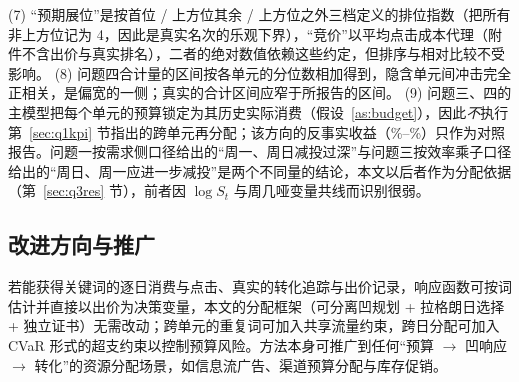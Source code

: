 (7) “预期展位”是按首位 / 上方位其余 / 上方位之外三档定义的排位指数（把所有非上方位记为 4，因此是真实名次的乐观下界），“竞价”以平均点击成本代理（附件不含出价与真实排名），二者的绝对数值依赖这些约定，但排序与相对比较不受影响。
(8) 问题四合计量的区间按各单元的分位数相加得到，隐含单元间冲击完全正相关，是偏宽的一侧；真实的合计区间应窄于所报告的区间。
(9) 问题三、四的主模型把每个单元的预算锁定为其历史实际消费（假设~\ref{as:budget}），因此\emph{不}执行第~\ref{sec:q1kpi} 节指出的跨单元再分配；该方向的反事实收益（\valQthreeCrossUnitGainPctFeb\%--\valQthreeCrossUnitGainPctAug\%）只作为对照报告。问题一按需求侧口径给出的“周一、周日减投过深”与问题三按效率乘子口径给出的“周日、周一应进一步减投”是两个不同量的结论，本文以后者作为分配依据（第~\ref{sec:q3res} 节），前者因 $\log S_t$ 与周几哑变量共线而识别很弱。

\subsection{改进方向与推广}
若能获得关键词的逐日消费与点击、真实的转化追踪与出价记录，响应函数可按词估计并直接以出价为决策变量，本文的分配框架（可分离凹规划 + 拉格朗日选择 + 独立证书）无需改动；跨单元的重复词可加入共享流量约束，跨日分配可加入 CVaR 形式的超支约束以控制预算风险。方法本身可推广到任何“预算 $\to$ 凹响应 $\to$ 转化”的资源分配场景，如信息流广告、渠道预算分配与库存促销。
